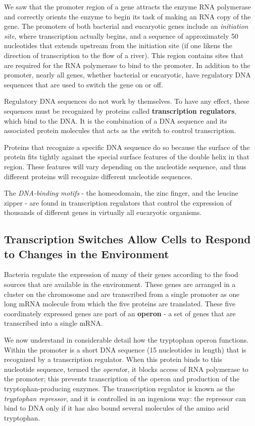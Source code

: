 We saw that the promoter region of a gene
attracts the enzyme RNA polymerase and correctly orients the enzyme to
begin its task of making an RNA copy of the gene. The promoters of both
bacterial and eucaryotic genes include an \textit{initiation site}, where transcription
actually begins, and a sequence of approximately 50 nucleotides that
extends upstream from the initiation site (if one likens the direction of
transcription to the flow of a river). This region contains sites that are
required for the RNA polymerase to bind to the promoter. In addition
to the promoter, nearly all genes, whether bacterial or eucaryotic, have
regulatory DNA sequences that are used to switch the gene on or off.

Regulatory DNA sequences do not work by themselves. To have any
effect, these sequences must be recognized by proteins called \textbf{transcription
regulators}, which bind to the DNA. It is the combination of a DNA
sequence and its associated protein molecules that acts as the switch
to control transcription.

Proteins that recognize a specific DNA sequence do so because the surface
of the protein fits tightly against the special surface features of the
double helix in that region. These features will vary depending on the
nucleotide sequence, and thus different proteins will recognize different
nucleotide sequences.

The \textit{DNA-binding motifs} - the homeodomain, the zinc finger, and the leucine zipper -
are found in transcription regulators that control the expression of thousands of different
genes in virtually all eucaryotic organisms.

\subsection{Transcription Switches Allow Cells to Respond to Changes in the Environment}

Bacteria regulate the expression of many of their genes according to the food sources
that are available in the environment. These
genes are arranged in a cluster on the chromosome and are transcribed
from a single promoter as one long mRNA molecule from which the five
proteins are translated. These five coordinately expressed genes are part of an
\textbf{operon} - a set of genes that are transcribed into a single mRNA.

We now understand in considerable detail how the tryptophan operon
functions. Within the promoter is a short DNA sequence (15 nucleotides
in length) that is recognized by a transcription regulator. When this protein
binds to this nucleotide sequence, termed the \textit{operato}r, it blocks
access of RNA polymerase to the promoter; this prevents transcription
of the operon and production of the tryptophan-producing enzymes. The
transcription regulator is known as the \textit{tryptophan repressor}, and it is controlled
in an ingenious way: the repressor can bind to DNA only if it has
also bound several molecules of the amino acid tryptophan.

